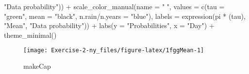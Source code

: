\documentclass[
]{article}
\newenvironment{Shaded}{\begin{snugshade}}{\end{snugshade}}
\newcommand{\AttributeTok}[1]{\textcolor[rgb]{0.77,0.63,0.00}{#1}}
\newcommand{\FunctionTok}[1]{\textcolor[rgb]{0.00,0.00,0.00}{#1}}
\newcommand{\NormalTok}[1]{#1}
\newcommand{\OtherTok}[1]{\textcolor[rgb]{0.56,0.35,0.01}{#1}}
\newcommand{\SpecialCharTok}[1]{\textcolor[rgb]{0.00,0.00,0.00}{#1}}
\newcommand{\StringTok}[1]{\textcolor[rgb]{0.31,0.60,0.02}{#1}}
\begin{document}
\begin{Shaded}
\begin{Highlighting}[]
    \StringTok{"Data probability"}\NormalTok{)) }\SpecialCharTok{+} \FunctionTok{scale\_color\_manual}\NormalTok{(}\AttributeTok{name =} \StringTok{" "}\NormalTok{, }\AttributeTok{values =} \FunctionTok{c}\NormalTok{(}\AttributeTok{tau =} \StringTok{"green"}\NormalTok{,}
    \AttributeTok{mean =} \StringTok{"black"}\NormalTok{, }\StringTok{\textasciigrave{}}\AttributeTok{n.rain/n.years}\StringTok{\textasciigrave{}} \OtherTok{=} \StringTok{"blue"}\NormalTok{), }\AttributeTok{labels =} \FunctionTok{expression}\NormalTok{(pi }\SpecialCharTok{*}\NormalTok{ (tau), }\StringTok{"Mean"}\NormalTok{,}
    \StringTok{"Data probability"}\NormalTok{)) }\SpecialCharTok{+} \FunctionTok{labs}\NormalTok{(}\AttributeTok{y =} \StringTok{"Probabilities"}\NormalTok{, }\AttributeTok{x =} \StringTok{"Day"}\NormalTok{) }\SpecialCharTok{+} \FunctionTok{theme\_minimal}\NormalTok{()}
\end{Highlighting}
\end{Shaded}

\begin{figure}

{\centering \texttt{[image: Exercise-2-ny\_files/figure-latex/1fggMean-1]} 

}

\caption{makeCap}\label{fig:1fggMean}
\end{figure}
\end{document}
